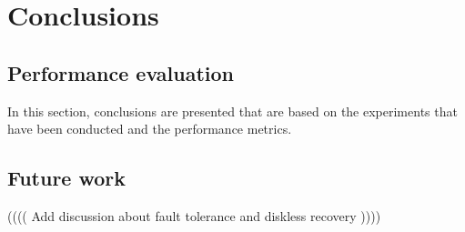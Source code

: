 \documentclass[MSc, ida]{histhesis}
\begin{document}
\section{Conclusions} %
\label{sec:conclusion}


\subsection{Performance evaluation} %
\label{sub:performance_evaluation}

In this section, conclusions are presented that are based on the experiments that have been conducted and the performance metrics.

\subsection{Future work} %
\label{sub:future_work}

(((( Add discussion about fault tolerance and diskless recovery ))))

\newpage



\end{document}
